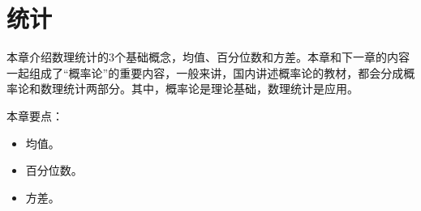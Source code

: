 \chapter{统计}

本章介绍数理统计的3个基础概念，均值、百分位数和方差。本章和下一章的内容一起组成了“概率论”的重要内容，一般来讲，国内讲述概率论的教材，都会分成概率论和数理统计两部分。其中，概率论是理论基础，数理统计是应用。

本章要点：
\begin{itemize}
    \item 均值。
    \item 百分位数。
    \item 方差。
\end{itemize}

\newpage


\newpage


\newpage


\newpage





